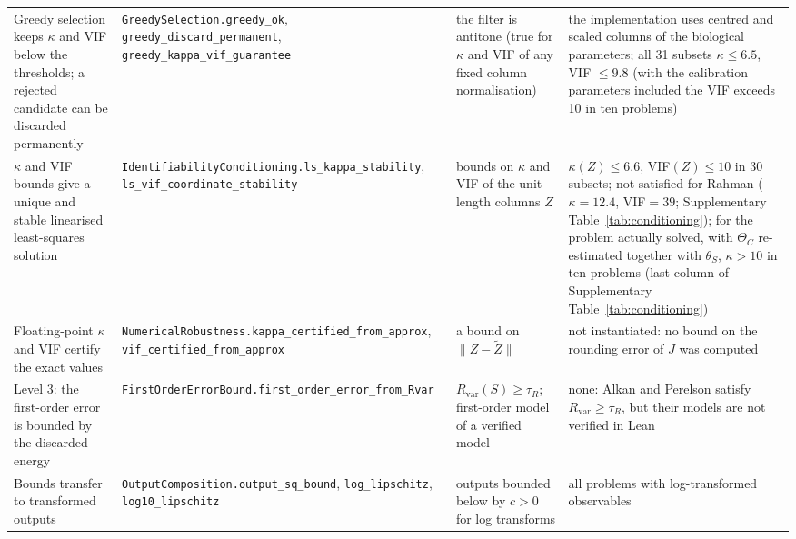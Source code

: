 \begin{longtable}{@{}>{\raggedright\arraybackslash}p{3.0cm}>{\raggedright\arraybackslash}p{3.4cm}>{\raggedright\arraybackslash}p{4.2cm}>{\raggedright\arraybackslash}p{4.4cm}@{}}
\addlinespace[3pt]
Greedy selection keeps $\kappa$ and VIF below the thresholds; a rejected candidate can be discarded permanently & \texttt{GreedySelection.\allowbreak{}greedy\_\allowbreak{}ok}, \texttt{greedy\_\allowbreak{}discard\_\allowbreak{}permanent}, \texttt{greedy\_\allowbreak{}kappa\_\allowbreak{}vif\_\allowbreak{}guarantee} & the filter is antitone (true for $\kappa$ and VIF of any fixed column normalisation) & the implementation uses centred and scaled columns of the biological parameters; all 31 subsets $\kappa\le6.5$, VIF $\le9.8$ (with the calibration parameters included the VIF exceeds 10 in ten problems) \\
\addlinespace[3pt]
$\kappa$ and VIF bounds give a unique and stable linearised least-squares solution & \texttt{Identifiability\allowbreak{}Conditioning.\allowbreak{}ls\_\allowbreak{}kappa\_\allowbreak{}stability}, \texttt{ls\_\allowbreak{}vif\_\allowbreak{}coordinate\_\allowbreak{}stability} & bounds on $\kappa$ and VIF of the unit-length columns $Z$ & $\kappa(Z)\le6.6$, VIF$(Z)\le10$ in 30 subsets; not satisfied for Rahman ($\kappa=12.4$, VIF$=39$; Supplementary Table~\ref{tab:conditioning}); for the problem actually solved, with $\Theta_C$ re-estimated together with $\theta_S$, $\kappa>10$ in ten problems (last column of Supplementary Table~\ref{tab:conditioning}) \\
\addlinespace[3pt]
Floating-point $\kappa$ and VIF certify the exact values & \texttt{NumericalRobustness.\allowbreak{}kappa\_\allowbreak{}certified\_\allowbreak{}from\_\allowbreak{}approx}, \texttt{vif\_\allowbreak{}certified\_\allowbreak{}from\_\allowbreak{}approx} & a bound on $\|Z-\tilde Z\|$ & not instantiated: no bound on the rounding error of $J$ was computed \\
\addlinespace[3pt]
Level 3: the first-order error is bounded by the discarded energy & \texttt{FirstOrderErrorBound.\allowbreak{}first\_\allowbreak{}order\_\allowbreak{}error\_\allowbreak{}from\_\allowbreak{}Rvar} & $R_{\mathrm{var}}(S)\ge\tau_R$; first-order model of a verified model & none: Alkan and Perelson satisfy $R_{\mathrm{var}}\ge\tau_R$, but their models are not verified in Lean \\
\addlinespace[3pt]
Bounds transfer to transformed outputs & \texttt{OutputComposition.\allowbreak{}output\_\allowbreak{}sq\_\allowbreak{}bound}, \texttt{log\_\allowbreak{}lipschitz}, \texttt{log10\_\allowbreak{}lipschitz} & outputs bounded below by $c>0$ for log transforms & all problems with log-transformed observables \\

\end{longtable}
